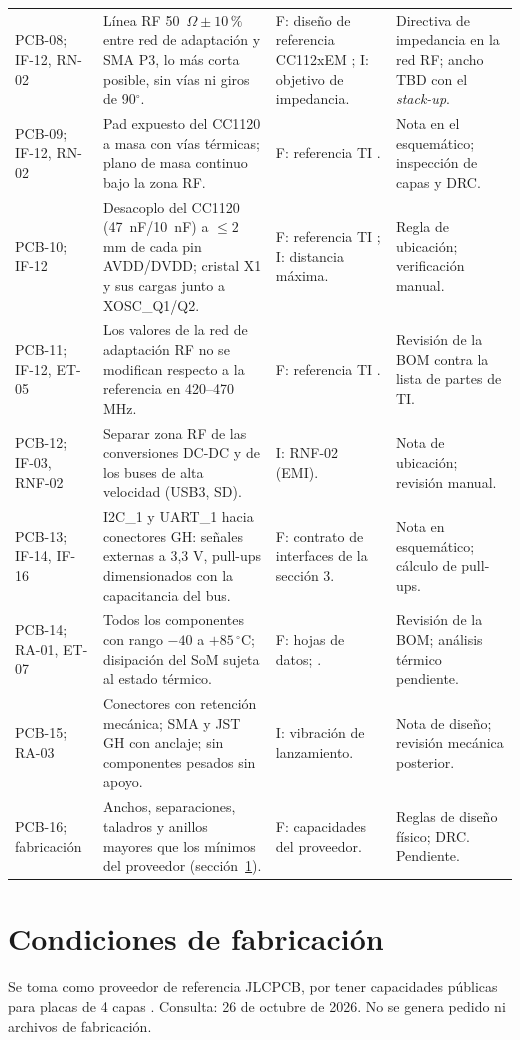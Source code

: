 \documentclass[11pt,letterpaper]{article}
\begin{document}
\begin{longtable}{L{2.5cm}L{4.5cm}L{4.1cm}L{4.4cm}}
PCB-08; IF-12, RN-02 & Línea RF 50~$\Omega\pm10\,\%$ entre red de adaptación y SMA P3, lo más corta posible, sin vías ni giros de 90$^\circ$. & F: diseño de referencia CC112xEM \cite{cc1120em}; I: objetivo de impedancia. & Directiva de impedancia en la red RF; ancho TBD con el \emph{stack-up}. \\
PCB-09; IF-12, RN-02 & Pad expuesto del CC1120 a masa con vías térmicas; plano de masa continuo bajo la zona RF. & F: referencia TI \cite{cc1120em}. & Nota en el esquemático; inspección de capas y DRC. \\
PCB-10; IF-12 & Desacoplo del CC1120 (47~nF/10~nF) a $\leq2$ mm de cada pin AVDD/DVDD; cristal X1 y sus cargas junto a XOSC\_Q1/Q2. & F: referencia TI \cite{cc1120em}; I: distancia máxima. & Regla de ubicación; verificación manual. \\
PCB-11; IF-12, ET-05 & Los valores de la red de adaptación RF no se modifican respecto a la referencia en 420--470 MHz. & F: referencia TI \cite{cc1120em}. & Revisión de la BOM contra la lista de partes de TI. \\
PCB-12; IF-03, RNF-02 & Separar zona RF de las conversiones DC-DC y de los buses de alta velocidad (USB3, SD). & I: RNF-02 (EMI). & Nota de ubicación; revisión manual. \\
PCB-13; IF-14, IF-16 & I2C\_1 y UART\_1 hacia conectores GH: señales externas a 3,3 V, pull-ups dimensionados con la capacitancia del bus. & F: contrato de interfaces de la sección 3. & Nota en esquemático; cálculo de pull-ups. \\
PCB-14; RA-01, ET-07 & Todos los componentes con rango $-40$ a $+85\,^\circ$C; disipación del SoM sujeta al estado térmico. & F: hojas de datos; \cite{verdinds}. & Revisión de la BOM; análisis térmico pendiente. \\
PCB-15; RA-03 & Conectores con retención mecánica; SMA y JST GH con anclaje; sin componentes pesados sin apoyo. & I: vibración de lanzamiento. & Nota de diseño; revisión mecánica posterior. \\
PCB-16; fabricación & Anchos, separaciones, taladros y anillos mayores que los mínimos del proveedor (sección~\ref{sec:fab}). & F: capacidades del proveedor. & Reglas de diseño físico; DRC. Pendiente. \\
\bottomrule
\end{longtable}
\normalsize

\section{Condiciones de fabricación}
\label{sec:fab}
Se toma como proveedor de referencia JLCPCB, por tener capacidades públicas para placas de 4 capas \cite{jlcpcb}. Consulta: 26 de octubre de 2026. No se genera pedido ni archivos de fabricación.
\end{document}
